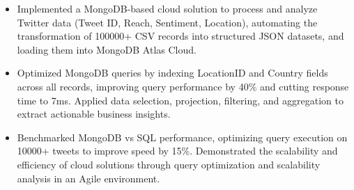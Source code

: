 \begin{samepage}
{
  {\begin{itemize}
    \item Implemented a MongoDB-based cloud solution to process and analyze Twitter data (Tweet ID, Reach, Sentiment, Location), automating the transformation of 100000+ CSV records into structured JSON datasets, and loading them into MongoDB Atlas Cloud.
    \item Optimized MongoDB queries by indexing LocationID and Country fields across all records, improving query performance by 40\% and cutting response time to 7ms. Applied data selection, projection, filtering, and aggregation to extract actionable business insights.
    \item Benchmarked MongoDB vs SQL performance, optimizing query execution on 10000+ tweets to improve speed by 15\%. Demonstrated the scalability and efficiency of cloud solutions through query optimization and scalability analysis in an Agile environment.
  \end{itemize}
  }
}
\end{samepage}
